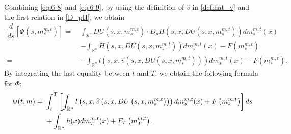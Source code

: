 \documentclass[11pt]{article}
\numberwithin{equation}{section}
\newcommand{\brn}{{\mathbb{R}^n}}
\newcommand{\1}{\mbox{1\hspace{-1mm}I}}
\begin{document}
Combining \eqref{eq:6-8} and \eqref{eq:6-9}, by using the definition of $\widehat{v}$ in \eqref{def:hat_v} and the first relation in \eqref{D_pH}, we obtain 
\begin{align*}
    \dfrac{d}{ds}\left[\Phi\left(s,m^{m,t}_s\right)\right]=\ & \int_{\brn}DU\left(s,x,m^{m,t}_s\right)\cdot D_p H\left(s,x,DU\left(s,x,m^{m,t}_s\right)\right)dm^{m,t}_s(x)\\
    &-\int_{\brn}H\left(s,x,DU\left(s,x,m^{m,t}_s\right)\right)dm^{m,t}_s(x)-F\left(m^{m,t}_s\right)\\
    =\ & -\int_{\brn}l\left(s,x,\widehat{v}\left(s,x,DU\left(s,x,m^{m,t}_s\right)\right)\right)dm^{m,t}_s(x)-F\left(m^{m,t}_s\right).
\end{align*}
By integrating the last equality between $t$ and $T$, we obtain the following formula for $\Phi$:
\begin{align}
    \Phi(t,m)=\ & \int_{t}^{T}\left[\int_{\brn}l\left(s,x,\widehat{v}\left(s,x,DU\left(s,x,m^{m,t}_s\right)\right)\right)dm^{m,t}_s(x)+F\left(m^{m,t}_s\right)\right]ds \notag \\
    &+\int_{\brn}h(x)dm^{m,t}_T(x)+F_{T}\left(m^{m,t}_T\right). \label{eq:6-11}
\end{align}
\end{document}

